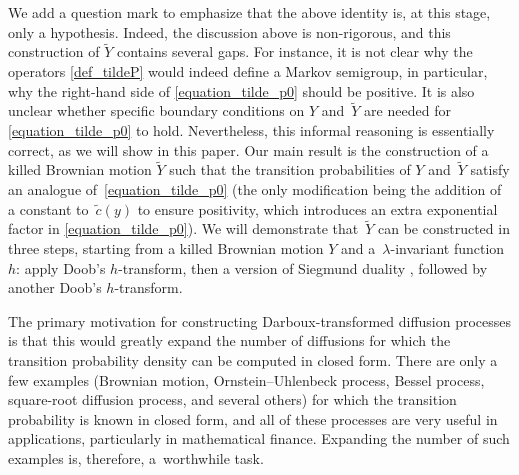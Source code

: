 \documentclass[10pt,a4paper]{amsart}
\numberwithin{equation}{section}
\theoremstyle{definition}
\begin{document}
We add a question mark to emphasize that the above identity is, at this stage, only a hypothesis. Indeed, the discussion above is non-rigorous, and this construction of $\widetilde Y$ contains several gaps. For instance, it is not clear why the operators
\eqref{def_tildeP} would indeed define a Markov semigroup, in particular, why the right-hand side of \eqref{equation_tilde_p0} should be positive. It is also unclear whether specific boundary conditions on $Y$ and~$\widetilde Y$ are needed for \eqref{equation_tilde_p0} to hold. Nevertheless, this informal reasoning is essentially correct, as we will show in this paper. Our main result is the construction of a killed Brownian motion $\widetilde Y$ such that the transition probabilities of $Y$ and~$\widetilde Y$ satisfy an analogue of~\eqref{equation_tilde_p0} (the only modification being the addition of a constant to~$\tilde c(y)$ to ensure positivity, which introduces an extra exponential factor in \eqref{equation_tilde_p0}). We will demonstrate that~$\widetilde Y$ can be constructed in three steps, starting from a killed Brownian motion $Y$ and a~$\lambda$-invariant function $h$: apply Doob’s $h$-transform, then a version of Siegmund duality \cite{Siegmund_1976}, followed by another Doob’s $h$-transform.

The primary motivation for constructing Darboux-transformed diffusion processes is that this would greatly expand the number of diffusions for which the transition probability density can be computed in closed form. There are only a few examples (Brownian motion, Ornstein–Uhlenbeck process, Bessel process, square-root diffusion process, and several others) for which the transition probability is known in closed form, and all of these processes are very useful in applications, particularly in mathematical finance. Expanding the number of such examples is, therefore, a~worthwhile task.
\end{document}
